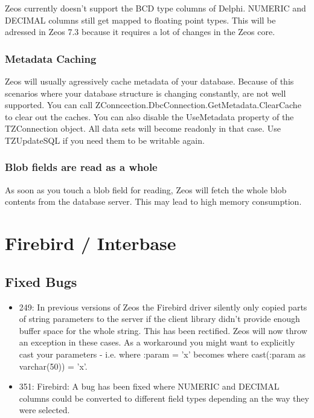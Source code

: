 \documentclass[a4paper,12pt,oneside]{book}
\begin{document}
Zeos currently doesn't support the BCD type columns of Delphi.
NUMERIC and DECIMAL columns still get mapped to floating point types.
This will be adressed in Zeos 7.3 because it requires a lot of changes in the Zeos core.

\subsubsection{Metadata Caching}
\label{sec:Rev6_General_KnownProblems_MetadataCaching}

Zeos will usually agressively cache metadata of your database.
Because of this scenarios where your database structure is changing constantly, are not well supported.
You can call ZConncection.\-DbcConnection.\-GetMetadata.\-ClearCache to clear out the caches.
You can also disable the UseMetadata property of the TZConnection object.
All data sets will become readonly in that case.
Use TZUpdateSQL if you need them to be writable again.

\subsubsection{Blob fields are read as a whole}
\label{sec:Rev6_General_KnownProblems_BlobFields}

As soon as you touch a blob field for reading, Zeos will fetch the whole blob contents from the database server.
This may lead to high memory consumption.

\section{Firebird / Interbase}
\label{sec:Rev6_FirebirdInterbase}

\subsection{Fixed Bugs}
\label{sec:Rev6_FirebirdInterbase_FixedBugs}

\begin{itemize}
\item 
  249: In previous versions of Zeos the Firebird driver silently only copied parts of string parameters to the server if the client library didn't provide enough buffer space for the whole string.
	This has been rectified.
	Zeos will now throw an exception in these cases.
	As a workaround you might want to explicitly cast your parameters - i.e. where :param = 'x' becomes where cast(:param as varchar(50)) = 'x'.
\item
  351: Firebird: A bug has been fixed where NUMERIC and DECIMAL columns could be converted to different field types depending an the way they were selected.
\end{itemize}
\end{document}
